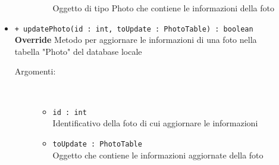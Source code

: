 \documentclass[../DefinizioneDiProdotto.tex]{subfiles}
\begin{document}
\begin{description}
\begin{itemize}
\begin{description}
\begin{itemize}
				Oggetto di tipo Photo che contiene le informazioni della foto\end{itemize}
		\end{description}
		\item \texttt{+ updatePhoto(id : int, toUpdate : PhotoTable) : boolean}\\
		\textbf{Override} Metodo per aggiornare le informazioni di una foto nella tabella "Photo" del database locale
		\begin{description}
			\item[Argomenti:] \
			\begin{itemize}
				\item \texttt{id : int}\\
				Identificativo della foto di cui aggiornare le informazioni\item \texttt{toUpdate : PhotoTable}\\
				Oggetto che contiene le informazioni aggiornate della foto\end{itemize}
		\end{description}
	\end{itemize}
\end{description}
\end{document}

